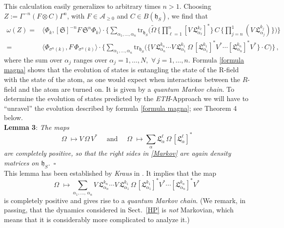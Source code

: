 \documentclass[12pt]{article}
\begin{document}
This calculation easily generalizes to arbitrary times $n>1$. Choosing
 $Z:= \Gamma^{-n} (F\otimes C) \Gamma^{n}$, with $F\in \mathcal{A}_{\geq 0}$ and $C\in B(\mathfrak{h}_{S})$,
  we find that
 \begin{align}\label{formula magna}
 \omega(Z)=& \langle \Phi_{{k}}, [\mathfrak{S}]^{-n} F\, \mathfrak{S}^{n} \Phi_{{k}}\rangle \cdot
\Big\{ \sum_{\alpha_1, \dots, \alpha_n} \text{tr}_{\mathfrak{h}_S} \Big(\widetilde{\Omega}\, \Big\{\prod_{\ell = 1}^{n} [V\,\mathfrak{L}_{\alpha_{\ell}}^{k_{\ell}}]^{*}\Big\}\, C\, \Big\{ \prod_{j=n}^{1} (V\, \mathfrak{L}_{\alpha_j}^{k_j})\Big\} \Big) \Big\}\nonumber \\
 =& \langle \Phi_{\sigma^{n}({k})}, F \,\Phi_{\sigma^{n}({k})} \rangle\cdot \Big\{\sum_{\alpha_1, \dots, \alpha_n}
 \text{tr}_{\mathfrak{h}_S} \Big(\Big\{V\,\mathfrak{L}_{\alpha_n}^{k_n} \cdots V\,\mathfrak{L}_{\alpha_1}^{k_1} \,\Omega\,
 [\mathfrak{L}_{\alpha_1}^{k_1}]^{*}V^{*}\cdots [\mathfrak{L}_{\alpha_n}^{k_n}]^{*}V^{*}\Big\}\cdot C\Big) \Big\}\,,
 \end{align}
where the sum over $\alpha_j$ ranges over $\alpha_j =1,\dots, N,\,\, \forall\, j=1,\dots, n$. Formula \eqref{formula magna}
shows that the evolution of states is entangling the state of the R-field with the state of the atom, as one
would expect when interactions between the $R$-field and the atom are turned on. It is given by a
\textit{quantum Markov chain}. To determine the evolution of states predicted by the \textit{ETH}-Approach we
will have to ``unravel'' the evolution described by formula \eqref{formula magna}; see Theorem 4 below.\\

{\bf{Lemma 3}}: \textit{The maps
\begin{equation}\label{Markov}
\Omega\,\, \mapsto V\,\Omega\,V^{*}\quad \text{ and }\quad
\Omega\,\, \mapsto \sum_{\alpha} \mathfrak{L}_{\alpha}^{\ell}\,\Omega\, [\mathfrak{L}_{\alpha}^{\ell}]^{*}
\end{equation}
are \textit{completely positive}, so that the right sides in \eqref{Markov} are again density matrices on $\mathfrak{h}_S$.}
\,$\square$\\

This lemma has been established by \textit{Kraus} in \cite{Kraus}. It implies that the map
$$\Omega\,\,\mapsto \sum_{\alpha_1, \dots, \, \alpha_n} V\,\mathfrak{L}_{\alpha_n}^{k_n} \cdots V\,\mathfrak{L}_{\alpha_1}^{k_1} \,\Omega\,
 [\mathfrak{L}_{\alpha_1}^{k_1}]^{*}V^{*}\cdots [\mathfrak{L}_{\alpha_n}^{k_n}]^{*}V^{*}$$
is completely positive and gives rise to a \textit{quantum Markov chain}. (We remark, in passing, that the dynamics considered in Sect.~\ref{HP} is \textit{not} Markovian, which means that it is considerably more complicated to analyze it.)\\
\end{document}
